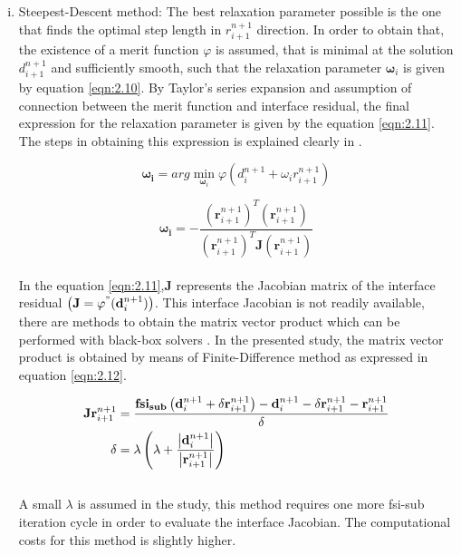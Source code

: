 \begin{enumerate}[(i)]
 \item Steepest-Descent method: The best relaxation parameter possible is the one that finds the optimal step length in $r_{i+1}^{n+1}$ direction. In order to obtain that, the existence of a merit function $\varphi$ is assumed, that is minimal at the solution $d_{i+1}^{n+1}$ and sufficiently smooth, such that the relaxation parameter $\mathbf{\omega}_{i}$ is given by equation \ref{eqn:2.10}. By Taylor's series expansion and assumption of connection between the merit function and interface residual, the final expression for the relaxation parameter is given by the equation \ref{eqn:2.11}. The steps in obtaining this expression is explained clearly in \citet{kuttler2008fixed}.
 
 \begin{equation}\label{eqn:2.10}
  \mathbf{\omega_{i}} = arg \min_{\mathbf{\omega}_{i}} \varphi(d_{i}^{n+1}+\omega_{i}r_{i+1}^{n+1})
 \end{equation}
 
 \begin{equation}\label{eqn:2.11}
  \mathbf{\omega_{i}} = -\frac{\left(\mathbf{r}_{i+1}^{n+1}\right)^T\left(\mathbf{r}_{i+1}^{n+1}\right)}{\left(\mathbf{r}_{i+1}^{n+1}\right)^T\mathbf{J}\left(\mathbf{r}_{i+1}^{n+1}\right)} 
 \end{equation}\\
  In the equation \ref{eqn:2.11},$\mathbf{J}$ represents the Jacobian matrix of the interface residual $\left(\mathbf{J} = \varphi^{"}(\mathbf{d}_{i}^{n+1})\right)$. This interface Jacobian is not readily available, there are methods to obtain the matrix vector product which can be performed with black-box solvers \citet{kuttler2008fixed}. In the presented study, the matrix vector product is obtained by means of Finite-Difference method as expressed in equation \ref{eqn:2.12}.
 
 \begin{align}\label{eqn:2.12}
   \mathbf{J}\mathbf{r}_{i+1}^{n+1} &= \frac{\mathbf{fsi_{sub}}\left(\mathbf{d}_{i}^{n+1}+\delta\mathbf{r}_{i+1}^{n+1}\right)-\mathbf{d}_{i}^{n+1}-\delta\mathbf{r}_{i+1}^{n+1}-\mathbf{r}_{i+1}^{n+1}}{\delta}\\
   \delta &= \lambda\left(\lambda+\frac{\abs{\mathbf{d}_{i}^{n+1}}}{\abs{\mathbf{r}_{i+1}^{n+1}}}\right) 
 \end{align}\\
 A small $\lambda$ is assumed in the study, this method requires one more fsi-sub iteration cycle in order to evaluate the interface Jacobian. The computational costs for this method is slightly higher. 
 \end{enumerate} 
 
